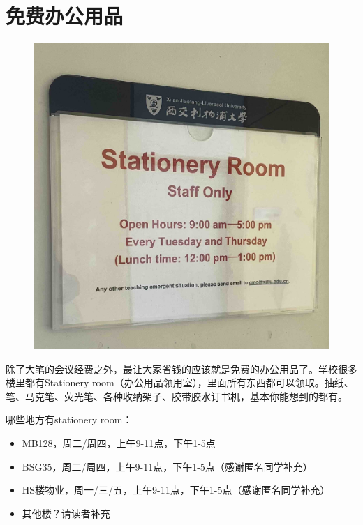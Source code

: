 \section{免费办公用品}
\begin{figure}[H]
    \centering
    \includegraphics[width=0.6\columnwidth]{author-folder/Kai.Wu/stationery_room.jpg}
\end{figure}

除了大笔的会议经费之外，最让大家省钱的应该就是免费的办公用品了。学校很多楼里都有Stationery room（办公用品领用室），里面所有东西都可以领取。抽纸、笔、马克笔、荧光笔、各种收纳架子、胶带胶水订书机，基本你能想到的都有。

\vspace{5mm}
哪些地方有stationery room：
\begin{itemize}
    \item MB128，周二/周四，上午9-11点，下午1-5点
    \item BSG35，周二/周四，上午9-11点，下午1-5点（感谢匿名同学补充）
    \item HS楼物业，周一/三/五，上午9-11点，下午1-5点（感谢匿名同学补充）
    \item 其他楼？请读者补充
\end{itemize}

